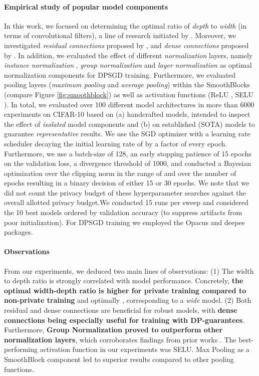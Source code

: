 \documentclass[nohyperref]{article}
\theoremstyle{plain}
\theoremstyle{definition}
\theoremstyle{remark}
\begin{document}
\paragraph{Empirical study of popular model components}
In this work, we focused on determining the optimal ratio of \textit{depth} to \textit{width} (in terms of convolutional filters), a line of research initiated by \citet{tan2019efficientnet}. Moreover, we investigated \textit{residual connections} proposed by \citet{he2016deep}, and \textit{dense connections} proposed by \cite{huang2017densely}. In addition, we evaluated the effect of different \textit{normalization} layers, namely \textit{instance normalization} \cite{ulyanov2016instance}, \textit{group normalization} \cite{wu2018group} and \textit{layer normalization} \cite{ba2016layer} as optimal normalization components for \acs{DPSGD} training. Furthermore, we evaluated pooling layers (\textit{maximum pooling} and \textit{average pooling}) within the SmoothBlocks (compare Figure \ref{fig:smoothblock}) as well as activation functions (ReLU \cite{nair2010rectified}, SELU \cite{klambauer2017self}). In total, we evaluated over 100 different model architectures in more than 6000 experiments on CIFAR-10 based on (a) handcrafted models, intended to inspect the effect of \textit{isolated} model components and (b) on established (SOTA) models to guarantee \textit{representative} results. We use the SGD optimizer with a learning rate scheduler decaying the initial learning rate of  by a factor of  every epoch. Furthermore, we use a batch-size of 128, an early stopping patience of 15 epochs on the validation loss, a divergence threshold of 1000, and conducted a Bayesian optimization over the  clipping norm in the range of  and over the number of epochs resulting in a binary decision of either 15 or 30 epochs. We note that we did not count the privacy budget of these hyperparameter searches against the overall allotted privacy budget.We conducted 15 runs per sweep and considered the 10 best models ordered by validation accuracy (to suppress artifacts from poor initialization). For \acs{DPSGD} training we employed the Opacus \cite{Opacus} and deepee \cite{ziller2021medical} packages.


\paragraph{Observations}
From our experiments, we deduced two main lines of observations: (1) The width to depth ratio is strongly correlated with model performance. Concretely, \textbf{the optimal width-depth ratio is higher for private training compared to non-private training} and optimally , corresponding to a \textit{wide} model. (2) Both residual and dense connections are beneficial for robust models, with \textbf{dense connections being especially useful for training with DP-guarantees}. Furthermore, \textbf{Group Normalization proved to outperform other normalization layers}, which corroborates findings from prior works \cite{klause2022differentially, de2022unlocking}. The best-performing activation function in our experiments was SELU. Max Pooling as a SmoothBlock component led to superior results compared to other pooling functions. 
\end{document}
